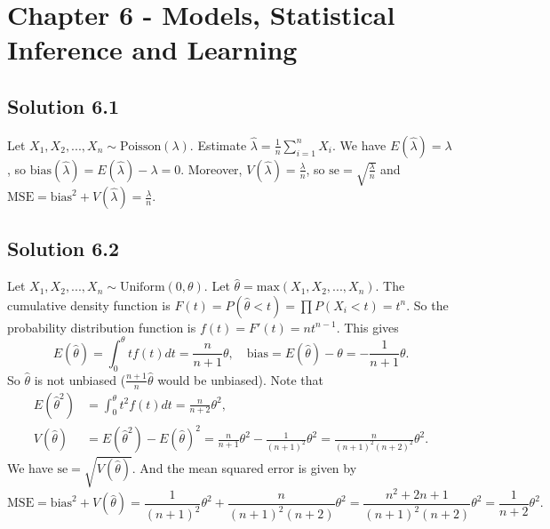 \section*{Chapter 6 - Models, Statistical Inference and Learning}

\subsection*{Solution 6.1}

Let $X_1, X_2, ..., X_n \sim \mathrm{Poisson}(\lambda)$.
Estimate $\hat{\lambda} = \frac{1}{n} \sum_{i = 1}^n X_i$.
We have $E(\hat{\lambda}) = \lambda$, so $\mathrm{bias}(\hat{\lambda}) = E(\hat{\lambda}) - \lambda = 0$.
Moreover, $V(\hat{\lambda}) = \frac{\lambda}{n}$, so $\mathrm{se} = \sqrt{\frac{\lambda}{n}}$ and $\mathrm{MSE} = \mathrm{bias}^2 + V(\hat{\lambda}) = \frac{\lambda}{n}$.


\subsection*{Solution 6.2}

Let $X_1, X_2, ..., X_n \sim \mathrm{Uniform}(0, \theta)$.
Let $\hat{\theta} = \mathrm{max}(X_1, X_2, ..., X_n)$.
The cumulative density function is $F(t) = P(\hat{\theta} < t) = \prod P(X_i < t) = t^n$.
So the probability distribution function is $f(t) = F'(t) = nt^{n-1}$.
This gives
\begin{equation*}
    E(\hat{\theta}) = \int_0^{\theta} tf(t) dt = \frac{n}{n+1} \theta, \quad
    \mathrm{bias} = E(\hat{\theta}) - \theta = - \frac{1}{n+1} \theta.
\end{equation*}
So $\hat{\theta}$ is not unbiased ($\frac{n+1}{n} \hat{\theta}$ would be unbiased).
Note that
\begin{equation*}
    \begin{split}
        E(\hat{\theta}^2) &= \int_0^{\theta} t^2 f(t) dt
            = \frac{n}{n+2} \theta^2, \\
        V(\hat{\theta}) &= E(\hat{\theta}^2) - E(\hat{\theta})^2
            = \frac{n}{n+1} \theta^2 - \frac{1}{(n+1)^2} \theta^2
            = \frac{n}{(n+1)^2 (n+2)^2} \theta^2.
    \end{split}
\end{equation*}
We have $\mathrm{se} = \sqrt{V(\hat{\theta})}$.
And the mean squared error is given by
\begin{equation*}
    \mathrm{MSE} = \mathrm{bias}^2 + V(\hat{\theta})
        = \frac{1}{(n+1)^2} \theta^2 + \frac{n}{(n+1)^2 (n+2)} \theta^2
        = \frac{n^2 + 2n + 1}{(n+1)^2 (n+2)} \theta^2
        = \frac{1}{n + 2} \theta^2.
\end{equation*}


